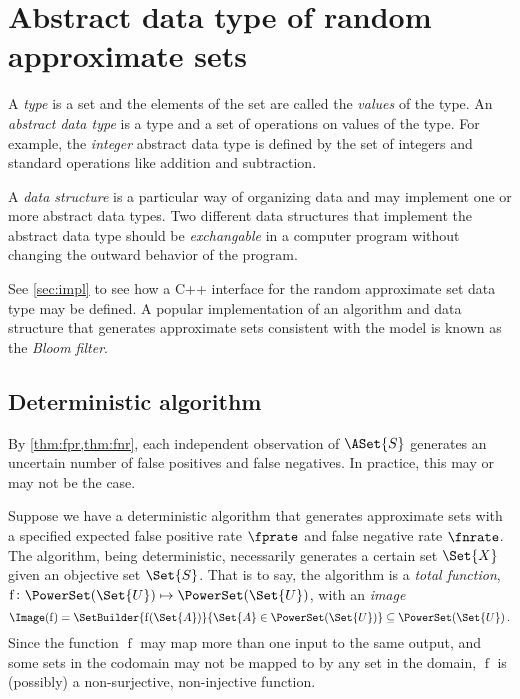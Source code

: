 \documentclass[ ../main.tex]{subfiles}
\begin{document}
\chapter{Abstract data type of random approximate sets}
\label{sec:adt}
A \emph{type} is a set and the elements of the set are called the \emph{values} 
of the type. An \emph{abstract data type} is a type and a set of operations on 
values of the type. For example, the \emph{integer} abstract data type is 
defined by the set of integers and standard operations like addition and 
subtraction.

A \emph{data structure} is a particular way of organizing data and may 
implement one or more abstract data types. Two different data structures that 
implement the abstract data type should be \emph{exchangable} in a computer 
program without changing the outward behavior of the program.

See \cref{sec:impl} to see how a C++ interface for the random approximate set 
data type may be defined. A popular implementation of an algorithm and data 
structure that generates approximate sets consistent with the model is known as 
the \emph{Bloom filter}.

\section{Deterministic algorithm}
By \cref{thm:fpr,thm:fnr}, each independent observation of $\ASet{S}$ generates 
an uncertain number of false positives and false negatives. In practice, this
may or may not be the case.

Suppose we have a deterministic algorithm that generates approximate sets with 
a specified expected false positive rate $\fprate$ and false negative rate 
$\fnrate$. The algorithm, being deterministic, necessarily generates a certain 
set $\Set{X}$ given an objective set $\Set{S}$. That is to say, the algorithm 
is a \emph{total function},
	$\operatorname{f} \colon \PowerSet(\Set{U}) \mapsto \PowerSet(\Set{U})$,
with an \emph{image}
\begin{equation}
\Image(\operatorname{f}) = 
    \SetBuilder{\operatorname{f}(\Set{A})}{\Set{A} \in \PowerSet(\Set{U})}
        \subseteq \PowerSet(\Set{U})\,.
\end{equation}
Since the function $\operatorname{f}$ may map more than one input to the same 
output, and some sets in the codomain may not be mapped to by any set in the 
domain, $\operatorname{f}$ is (possibly) a non-surjective, non-injective 
function.
\end{document}
